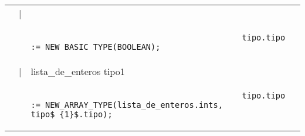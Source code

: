\begin{tabular}{r c p{}}
					& | 					& \ter{booleano} \\
					&					& \begin{lstlisting}
											tipo.tipo := NEW_BASIC_TYPE(BOOLEAN);
										\end{lstlisting} \\

					& | 					& \ter{array} \ter{[} lista\_de\_enteros \ter{]} \ter{de} tipo1 \\
					&					& \begin{lstlisting}
											tipo.tipo := NEW_ARRAY_TYPE(lista_de_enteros.ints, tipo$_{1}$.tipo);
										\end{lstlisting} \\
					
\end{tabular}

